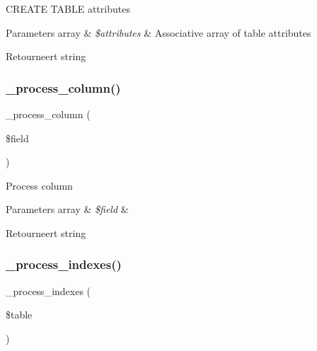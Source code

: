 C\+R\+E\+A\+TE T\+A\+B\+LE attributes


\begin{DoxyParams}[1]{Parameters}
array & {\em \$attributes} & Associative array of table attributes \\
\hline
\end{DoxyParams}
\begin{DoxyReturn}{Retourneert}
string 
\end{DoxyReturn}
\mbox{\label{class_c_i___d_b__mysqli__forge_a8f38f1c5b5dddecca4befbe393f3f299}} 
\subsubsection{\texorpdfstring{\_process\_column()}{\_process\_column()}}
{\footnotesize\ttfamily \+\_\+process\+\_\+column (\begin{DoxyParamCaption}\item[{}]{\$field }\end{DoxyParamCaption})\hspace{0.3cm}{\ttfamily [protected]}}

Process column


\begin{DoxyParams}[1]{Parameters}
array & {\em \$field} & \\
\hline
\end{DoxyParams}
\begin{DoxyReturn}{Retourneert}
string 
\end{DoxyReturn}
\mbox{\label{class_c_i___d_b__mysqli__forge_ae0bdb4ea3418590d1894c5b621b5ca50}} 
\subsubsection{\texorpdfstring{\_process\_indexes()}{\_process\_indexes()}}
{\footnotesize\ttfamily \+\_\+process\+\_\+indexes (\begin{DoxyParamCaption}\item[{}]{\$table }\end{DoxyParamCaption})\hspace{0.3cm}{\ttfamily [protected]}}

